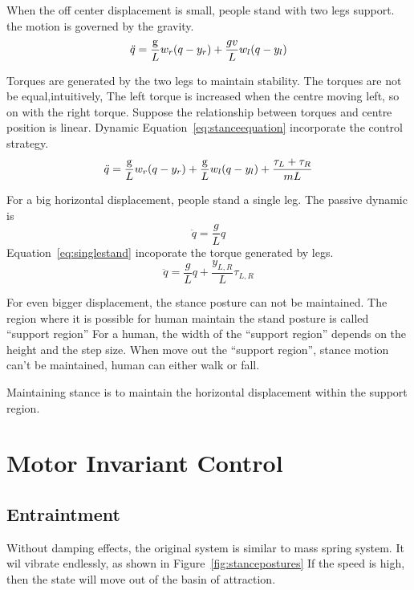 \begin{itemize}
When the off center  displacement  is small, people stand with two legs support.
the motion is governed by the gravity.
\[
\ddot{q}=\frac{\mathrm{g}}{L}w_r(q-y_r)+\frac{gv}{L}w_l(q-y_l)
\]

Torques are generated by the two legs to maintain stability.
The torques are not be equal,intuitively,
The left torque is increased when the centre moving left, so on with the right torque.
Suppose the relationship between torques and centre position is linear.
Dynamic Equation~\ref{eq:stanceequation} incorporate the control strategy.
\begin{equation}
\label{eq:stanceequation}
\ddot{q}=\frac{\mathrm{g}}{L}w_r(q-y_r)+\frac{\mathrm{g}}{L}w_l(q-y_l)+\frac{\tau_L+\tau_R}{mL}
\end{equation}



For a big horizontal  displacement,  people stand a single leg.
The passive dynamic is
\[
\ddot{q}=\frac{g}{L}q
\]
Equation~\ref{eq:singlestand} incoporate the torque generated by legs.
\begin{equation}
\label{eq:singlestand}
\ddot{q}=\frac{g}{L}q+\frac{y_{L,R}}{L}\tau_{L,R}
\end{equation}

For even bigger displacement,  the stance posture can not be maintained.
The region where it is possible for human maintain the stand posture is called ``support region''
For a human, the width of the ``support region'' depends on the  height and the step size.
When move out the ``support region'', stance motion can't be maintained, human can either walk or fall.
\end{itemize}


Maintaining stance is to maintain the horizontal displacement within the support region.

\section {Motor Invariant Control}
\subsection{Entraintment}
Without damping effects, the original system is similar to mass spring system.
It wil vibrate endlessly, as shown in Figure~\ref{fig:stancepostures}
If the speed is high, then the state will move out of the basin of attraction.


